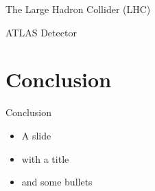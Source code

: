 \documentclass[10pt]{beamer}
\begin{document}
\begin{frame}{The Large Hadron Collider (LHC)}
\end{frame}

\begin{frame}{ATLAS Detector}
\end{frame}


\section{Conclusion}
\frame{\sectionpage}

\begin{frame}{Conclusion}
    \begin{itemize}
        \item A slide
        \item with a title
        \item and some bullets
    \end{itemize}
\end{frame}
\end{document}
